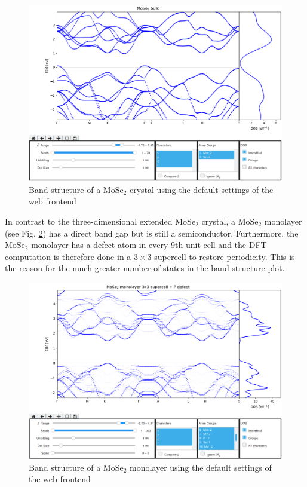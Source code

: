 \begin{figure}[htb!]
    \centering
    \includegraphics[width=1.0\linewidth]{img/gui_web_mose2_crystal.png}
    \caption[Band structure of a $\textrm{MoSe}_2$ crystal]{Band structure of a $\textrm{MoSe}_2$ crystal using the default settings of the web frontend}
    \label{example1}
\end{figure}

In contrast to the three-dimensional extended $\textrm{MoSe}_2$ crystal, a $\textrm{MoSe}_2$ monolayer (see Fig. \ref{example2}) has a direct band gap but is still a semiconductor. Furthermore, the $\textrm{MoSe}_2$ monolayer has a defect atom in every 9th unit cell and the DFT computation is therefore done in a $3 \times 3$ supercell to restore periodicity. This is the reason for the much greater number of states in the band structure plot. 

\begin{figure}[htb!]
    \centering
    \includegraphics[width=1.0\linewidth]{img/gui_web_mose2_monolayer_unfold-1.png}
    \caption[Band structure of a $\textrm{MoSe}_2$ monolayer]{Band structure of a $\textrm{MoSe}_2$ monolayer using the default settings of the web frontend}
    \label{example2}
\end{figure}

